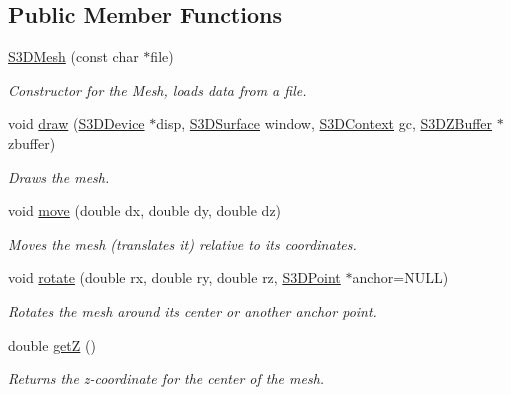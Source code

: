 \subsection*{Public Member Functions}
\begin{DoxyCompactItemize}
\item 
\hyperlink{class_s3_d_mesh_a810cf0f60312bc574e347d6248499258}{S3DMesh} (const char $\ast$file)
\begin{DoxyCompactList}\small\item\em Constructor for the Mesh, loads data from a file. \item\end{DoxyCompactList}\item 
void \hyperlink{class_s3_d_mesh_afc47824c491991604931f4ccb0520cd1}{draw} (\hyperlink{types_8h_a25c0773a29204332721bde1b164d0b84}{S3DDevice} $\ast$disp, \hyperlink{types_8h_a4afc89c514af26434688c7e8b382ba5e}{S3DSurface} window, \hyperlink{types_8h_a46f30693e0040340e595d8228cc31779}{S3DContext} gc, \hyperlink{class_s3_d_z_buffer}{S3DZBuffer} $\ast$zbuffer)
\begin{DoxyCompactList}\small\item\em Draws the mesh. \item\end{DoxyCompactList}\item 
void \hyperlink{class_s3_d_mesh_a15edf10bf8a749627f11235c618734f7}{move} (double dx, double dy, double dz)
\begin{DoxyCompactList}\small\item\em Moves the mesh (translates it) relative to its coordinates. \item\end{DoxyCompactList}\item 
void \hyperlink{class_s3_d_mesh_affff1ac3ef33b293a9ec9881a4e13993}{rotate} (double rx, double ry, double rz, \hyperlink{class_s3_d_point}{S3DPoint} $\ast$anchor=NULL)
\begin{DoxyCompactList}\small\item\em Rotates the mesh around its center or another anchor point. \item\end{DoxyCompactList}\item 
double \hyperlink{class_s3_d_mesh_aa11c4dd0ce01443c07afaabc0e206881}{getZ} ()
\begin{DoxyCompactList}\small\item\em Returns the z-\/coordinate for the center of the mesh. \item\end{DoxyCompactList}\end{DoxyCompactItemize}


